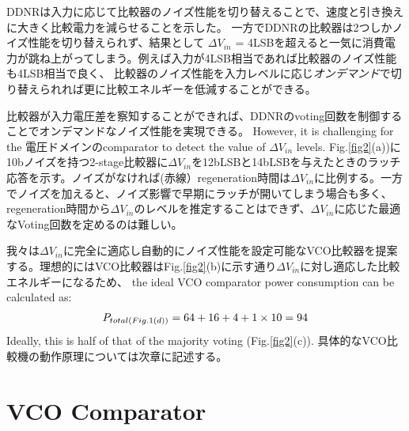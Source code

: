 \documentclass[letterpaper, 10 pt, conference]{ieeeconf}  %
\begin{document}
DDNRは入力に応じて比較器のノイズ性能を切り替えることで、速度と引き換えに大きく比較電力を減らせることを示した。
一方でDDNRの比較器は2つしかノイズ性能を切り替えられず、結果として $\Delta V_{in}$ = 4LSBを超えると一気に消費電力が跳ね上がってしまう。例えば入力が4LSB相当であれば比較器のノイズ性能も4LSB相当で良く、 比較器のノイズ性能を入力レベルに応じ\textit{オンデマンド}で切り替えられれば更に比較エネルギーを低減することができる。 

比較器が入力電圧差を察知することができれば、DDNRのvoting回数を制御することでオンデマンドなノイズ性能を実現できる。
However, it is challenging for the 電圧ドメインのcomparator to detect the value of $\Delta V_{in}$ levels. Fig.\ref{fig2}(a))に10bノイズを持つ2-stage比較器\cite{miyahara2008low}に$\Delta V_{in}$を12bLSBと14bLSBを与えたときのラッチ応答を示す。ノイズがなければ(赤線）regeneration時間は$\Delta V_{in}$に比例する。一方でノイズを加えると、ノイズ影響で早期にラッチが開いてしまう場合も多く、regeneration時間から$\Delta V_{in}$のレベルを推定することはできず、$\Delta V_{in}$に応じた最適なVoting回数を定めるのは難しい。

我々は$\Delta V_{in}$に完全に適応し自動的にノイズ性能を設定可能なVCO比較器を提案する。理想的にはVCO比較器はFig.\ref{fig2}(b)に示す通り$\Delta V_{in}$に対し適応した比較エネルギーになるため、 the ideal VCO comparator power consumption can be calculated as:
\begin{eqnarray}
    \centering
    P_{total(Fig.1(d))} = 64+16+4+1\times 10=94
    \label{ddnr}
\end{eqnarray}
Ideally, this is half of that of the majority voting (Fig.\ref{fig2}(c)). 
具体的なVCO比較機の動作原理については次章に記述する。


\section{VCO Comparator}
\end{document}
